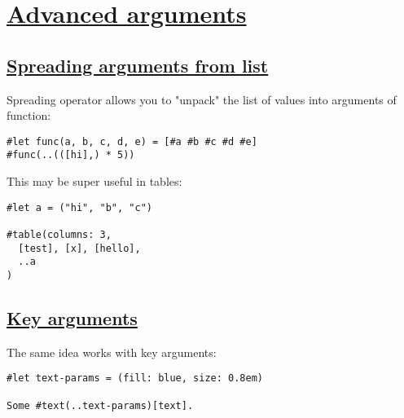 \section{\texorpdfstring{\hyperref[advanced-arguments]{Advanced
arguments}}{Advanced arguments}}\label{advanced-arguments}

\subsection{\texorpdfstring{\hyperref[spreading-arguments-from-list]{Spreading
arguments from
list}}{Spreading arguments from list}}\label{spreading-arguments-from-list}

Spreading operator allows you to "unpack" the list of values into
arguments of function:

\begin{verbatim}
#let func(a, b, c, d, e) = [#a #b #c #d #e]
#func(..(([hi],) * 5))
\end{verbatim}

\pandocbounded{}

This may be super useful in tables:

\begin{verbatim}
#let a = ("hi", "b", "c")

#table(columns: 3,
  [test], [x], [hello],
  ..a
)
\end{verbatim}

\pandocbounded{}

\subsection{\texorpdfstring{\hyperref[key-arguments]{Key
arguments}}{Key arguments}}\label{key-arguments}

The same idea works with key arguments:

\begin{verbatim}
#let text-params = (fill: blue, size: 0.8em)

Some #text(..text-params)[text].
\end{verbatim}

\pandocbounded{}

